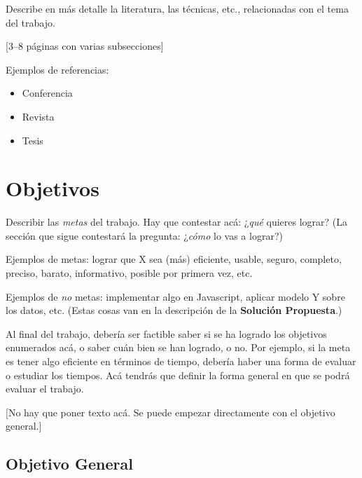 \documentclass[informe,guia]{upropuesta}
\begin{document}
\begin{pauta}
Describe en más detalle la literatura, las técnicas, etc., relacionadas con el tema del trabajo.

[3--8 páginas con varias subsecciones]
\end{pauta}

Ejemplos de referencias:

\begin{itemize}
  \item Conferencia~\cite{CorlessJK97}
  \item Revista~\cite{NewmanT42}
  \item Tesis~\cite{Turing38}
\end{itemize}


\section{Objetivos}\label{chap:obj}

\begin{pauta}
Describir las \textit{metas} del trabajo. Hay que contestar acá: ¿\textit{qué} quieres lograr? (La sección que sigue contestará la pregunta: ¿\textit{cómo} lo vas a lograr?)

Ejemplos de metas: lograr que X sea (más) eficiente, usable, seguro, completo, preciso, barato, informativo, posible por primera vez, etc.

Ejemplos de \textit{no} metas: implementar algo en Javascript, aplicar modelo Y sobre los datos, etc. (Estas cosas van en la descripción de la \textbf{Solución Propuesta}.)

Al final del trabajo, debería ser factible saber si se ha logrado los objetivos enumerados acá, o saber cuán bien se han logrado, o no. Por ejemplo, si la meta es tener algo eficiente en términos de tiempo, debería haber una forma de evaluar o estudiar los tiempos. Acá tendrás que definir la forma general en que se podrá evaluar el trabajo.

[No hay que poner texto acá. Se puede empezar directamente con el objetivo general.]
\end{pauta}

  \subsection*{Objetivo General}\label{sec:obj-g}
  
\end{document}
